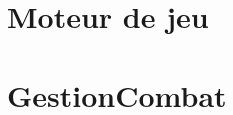 \documentclass[a4paper, 11pt, notitlepage]{report}
\begin{document}
\section{Moteur de jeu}
\begin{Test}
	    
\end{Test}
\section{GestionCombat}
\begin{Test}
	

\end{Test}
\end{document}
